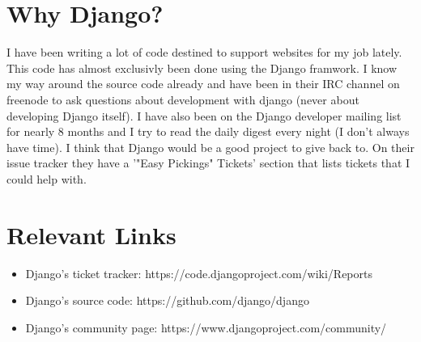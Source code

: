 \documentclass[12pt]{article}
\begin{document}
\section{Why Django?}
I have been writing a lot of code destined to support websites for my job
lately. This code has almost exclusivly been done using the Django
framwork. I know my way around the source code already and have been in
their IRC channel on freenode to ask questions about development with django
(never about developing Django itself). I have also been on the Django
developer mailing list for nearly 8 months and I try to read the daily digest
every night (I don't always have time). I think that Django would be a good
project to give back to. On their issue tracker they have a '"Easy Pickings"
Tickets' section that lists tickets that I could help with.

\section{Relevant Links}
\begin{itemize}
\item Django's ticket tracker: https://code.djangoproject.com/wiki/Reports
\item Django's source code: https://github.com/django/django
\item Django's community page: https://www.djangoproject.com/community/
\end{itemize}
\end{document}
